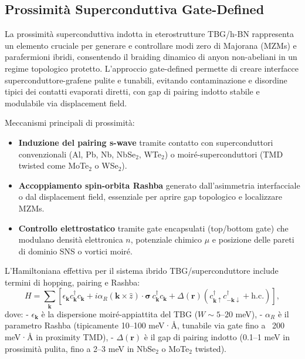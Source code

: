 \documentclass[11pt,a4paper]{article}
\theoremstyle{plain}
\theoremstyle{definition}
\begin{document}
\vspace{0.5cm}





\subsection{Prossimità Superconduttiva Gate-Defined}

La prossimità superconduttiva indotta in eterostrutture TBG/h-BN rappresenta un elemento cruciale per generare e controllare modi zero di Majorana (MZMs) e parafermioni ibridi, consentendo il braiding dinamico di anyon non-abeliani in un regime topologico protetto. L'approccio gate-defined permette di creare interfacce superconduttore-grafene pulite e tunabili, evitando contaminazione e disordine tipici dei contatti evaporati diretti, con gap di pairing indotto stabile e modulabile via displacement field.

Meccanismi principali di prossimità:
\begin{itemize}
    \item \textbf{Induzione del pairing s-wave} tramite contatto con superconduttori convenzionali (Al, Pb, Nb, NbSe$_2$, WTe$_2$) o moiré-superconduttori (TMD twisted come MoTe$_2$ o WSe$_2$).
    \item \textbf{Accoppiamento spin-orbita Rashba} generato dall'asimmetria interfacciale o dal displacement field, essenziale per aprire gap topologico e localizzare MZMs.
    \item \textbf{Controllo elettrostatico} tramite gate encapsulati (top/bottom gate) che modulano densità elettronica $n$, potenziale chimico $\mu$ e posizione delle pareti di dominio SNS o vortici moiré.
\end{itemize}

L'Hamiltoniana effettiva per il sistema ibrido TBG/superconduttore include termini di hopping, pairing e Rashba:
\begin{equation}
H = \sum_{\mathbf{k}} \left[ \epsilon_{\mathbf{k}} c^\dagger_{\mathbf{k}} c_{\mathbf{k}} + i \alpha_R (\mathbf{k} \times \hat{z}) \cdot \boldsymbol{\sigma} \, c^\dagger_{\mathbf{k}} c_{\mathbf{k}} + \Delta(\mathbf{r}) (c^\dagger_{\mathbf{k}\uparrow} c^\dagger_{-\mathbf{k}\downarrow} + \mathrm{h.c.}) \right],
\end{equation}
dove:
- $\epsilon_{\mathbf{k}}$ è la dispersione moiré-appiattita del TBG ($W \sim 5$--$20$ meV),
- $\alpha_R$ è il parametro Rashba (tipicamente 10--100 meV·Å, tunabile via gate fino a ~200 meV·Å in proximity TMD),
- $\Delta(\mathbf{r})$ è il gap di pairing indotto (0.1--1 meV in prossimità pulita, fino a 2--3 meV in NbSe$_2$ o MoTe$_2$ twisted).
\end{document}
